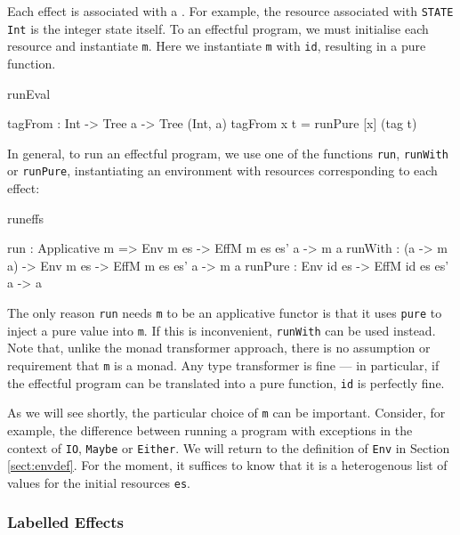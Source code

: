 \noindent
Each effect is associated with a . For example, the resource
associated with \texttt{STATE Int} is the integer state itself.  To 
an effectful program, we must initialise each resource and instantiate
\texttt{m}. Here we instantiate \texttt{m} with \texttt{id}, resulting in a
pure function.

\begin{SaveVerbatim}{runEval}

tagFrom : Int -> Tree a -> Tree (Int, a)
tagFrom x t = runPure [x] (tag t)

\end{SaveVerbatim}

\noindent
In general, to run an effectful program, we use one of the functions
\texttt{run}, \texttt{runWith} or \texttt{runPure}, instantiating an
environment with resources corresponding to each effect:

\begin{SaveVerbatim}{runeffs}

run     : Applicative m => 
          Env m es -> EffM m es es' a -> m a
runWith : (a -> m a) -> 
          Env m es -> EffM m es es' a -> m a
runPure : Env id es -> EffM id es es' a -> a

\end{SaveVerbatim}

\noindent
The only reason \texttt{run} needs \texttt{m} to be an applicative functor
is that it uses \texttt{pure} to inject a pure value into \texttt{m}. If this
is inconvenient, \texttt{runWith} can be used instead. Note that, unlike the
monad transformer approach, there is no assumption or requirement that
\texttt{m} is a monad. Any type transformer is fine --- in particular,
if the effectful program can be translated into a pure function, \texttt{id}
is perfectly fine.

As we will see shortly, the particular choice of \texttt{m} can be
important. Consider, for example, the difference between running a program with
exceptions in the context of \texttt{IO}, \texttt{Maybe} or \texttt{Either}.
%
We will return to the definition of \texttt{Env} in Section \ref{sect:envdef}.
For the moment, it suffices to know that it is a heterogenous list of values
for the initial resources \texttt{es}.

\subsubsection{Labelled Effects}

